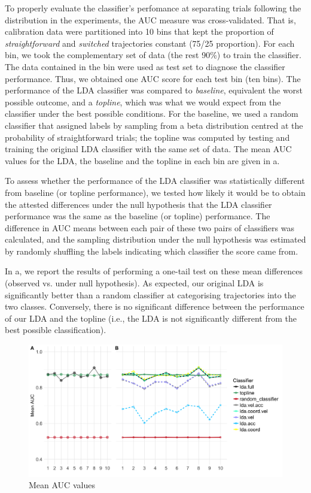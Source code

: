 \documentclass{article}
\begin{document}
To properly evaluate the classifier's perfomance at separating trials following the distribution in the experiments, the AUC measure was cross-validated. That is, calibration data were partitioned into 10 bins that kept the proportion of \textit{straightforward} and \textit{switched} trajectories constant (75/25 proportion). For each bin, we took the complementary set of data (the rest 90\%) to train the classifier. The data contained in the bin were used as test set to diagnose the classifier performance. Thus, we obtained one AUC score for each test bin (ten bins). The performance of the LDA classifier was compared to \emph{baseline}, equivalent the worst possible outcome, and a \emph{topline}, which was what we would expect from the classifier under the best possible conditions. 
For the baseline, we used a random classifier that assigned labels by sampling from a beta distribution centred at the probability of straightforward trials; the topline was computed by testing and training the original LDA classifier with the same set of data. 
The mean AUC values for the LDA, the baseline and the topline in each bin are given in a. 

To assess whether the performance of the LDA classifier was statistically different from baseline (or topline performance), we tested how likely it would be to obtain the attested differences under the null hypothesis that the LDA classifier performance was the same as the baseline (or topline) performance.   
The difference in AUC means between each pair of these two pairs of classifiers was calculated, and the sampling distribution under the null hypothesis was estimated by randomly shuffling the labels indicating which classifier the score came from.

In a, we report the results of performing a one-tail test on these mean differences (observed vs. under null hypothesis). As expected, our original LDA is significantly better than a random classifier at categorising trajectories into the two classes. Conversely, there is no significant difference between the performance of our LDA and the topline (i.e., the LDA is not significantly different from the best possible classification). 

\begin{figure}
\centering
\includegraphics[width=\textwidth]{auc_calibration_2.png}
\caption{Mean AUC values} \label{DIST:AUC}
\end{figure}
\end{document}
